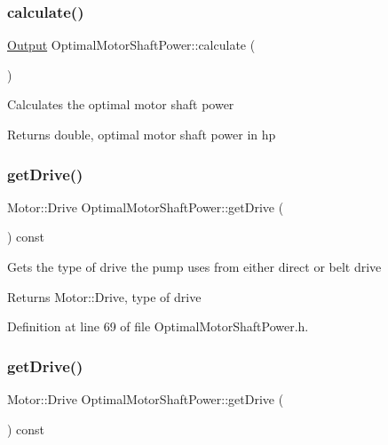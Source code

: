 \subsubsection{\texorpdfstring{calculate()}{calculate()}\hspace{0.1cm}{\footnotesize\ttfamily [3/3]}}
{\footnotesize\ttfamily \hyperlink{struct_optimal_motor_shaft_power_1_1_output}{Output} Optimal\+Motor\+Shaft\+Power\+::calculate (\begin{DoxyParamCaption}{ }\end{DoxyParamCaption})}

Calculates the optimal motor shaft power \begin{DoxyReturn}{Returns}
double, optimal motor shaft power in hp 
\end{DoxyReturn}
\mbox{\label{class_optimal_motor_shaft_power_a3cc369285d8b3582fcd8c44e5a1c37c8}} 
\subsubsection{\texorpdfstring{get\+Drive()}{getDrive()}\hspace{0.1cm}{\footnotesize\ttfamily [1/3]}}
{\footnotesize\ttfamily Motor\+::\+Drive Optimal\+Motor\+Shaft\+Power\+::get\+Drive (\begin{DoxyParamCaption}{ }\end{DoxyParamCaption}) const\hspace{0.3cm}{\ttfamily [inline]}}

Gets the type of drive the pump uses from either direct or belt drive \begin{DoxyReturn}{Returns}
Motor\+::\+Drive, type of drive 
\end{DoxyReturn}


Definition at line 69 of file Optimal\+Motor\+Shaft\+Power.\+h.

\mbox{\label{class_optimal_motor_shaft_power_a3cc369285d8b3582fcd8c44e5a1c37c8}} 
\subsubsection{\texorpdfstring{get\+Drive()}{getDrive()}\hspace{0.1cm}{\footnotesize\ttfamily [2/3]}}
{\footnotesize\ttfamily Motor\+::\+Drive Optimal\+Motor\+Shaft\+Power\+::get\+Drive (\begin{DoxyParamCaption}{ }\end{DoxyParamCaption}) const\hspace{0.3cm}{\ttfamily [inline]}}

